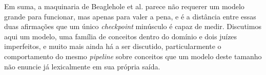 Em suma, a maquinaria de Beaglehole et al. parece não requerer um modelo grande para
funcionar, mas apenas para valer a pena, e é a distância entre essas duas afirmações que um
único \textit{checkpoint} minúsculo é capaz de medir. Discutimos aqui um modelo, uma
família de conceitos dentro do domínio e dois juízes imperfeitos, e muito mais ainda há a
ser discutido, particularmente o comportamento do mesmo \textit{pipeline} sobre conceitos
que um modelo deste tamanho não enuncie já lexicalmente em sua própria saída.

